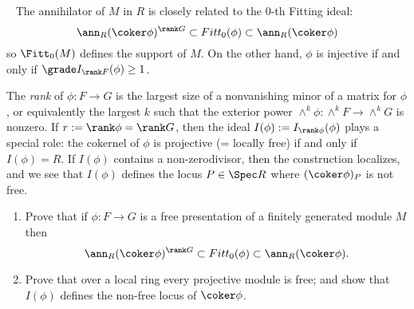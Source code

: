 \begin{exercise}~\label{Fitt}
The annihilator of $M$ in $R$
is closely related to the 0-th Fitting ideal:
$$
\ann_{R}(\coker \phi)^{\rank G}\subset Fitt_{0}(\phi) \subset \ann_{R}(\coker \phi)
$$
so $\Fitt_{0}(M)$ defines the support of $M$. On the other hand, $\phi$ is injective
if and only if $\grade I_{\rank F}(\phi) \geq 1$.

The \emph{rank} of $\phi: F\to G$ is the largest size of a nonvanishing minor of a matrix for $\phi$,
or equivalently the largest $k$ such that the exterior power $\wedge^{k}\phi : \wedge^{k}F \to \wedge^{k}G$
is nonzero. If $r:= \rank \phi = \rank G$, then the ideal $I(\phi): = I_{\rank \phi}(\phi)$ plays a special role: the cokernel of $\phi$
is projective (= locally free) if and only if $I(\phi) = R$. If $I(\phi)$ contains a non-zerodivisor, then
the construction localizes, and we see that $I(\phi)$ defines the locus  $P\in \Spec R$ where $(\coker \phi)_{P}$
is not free. 

\begin{enumerate}
 \item Prove that if $\phi: F\to G$ is a free presentation of a finitely generated module $M$
then 
$$
\ann_{R}(\coker \phi)^{\rank G}\subset Fitt_{0}(\phi) \subset \ann_{R}(\coker \phi).
$$
\item Prove that over a local ring every projective module is free; and show that 
$I(\phi)$ defines the non-free locus of $\coker \phi$. 
\end{enumerate}

\end{exercise}






%
%
%
%
